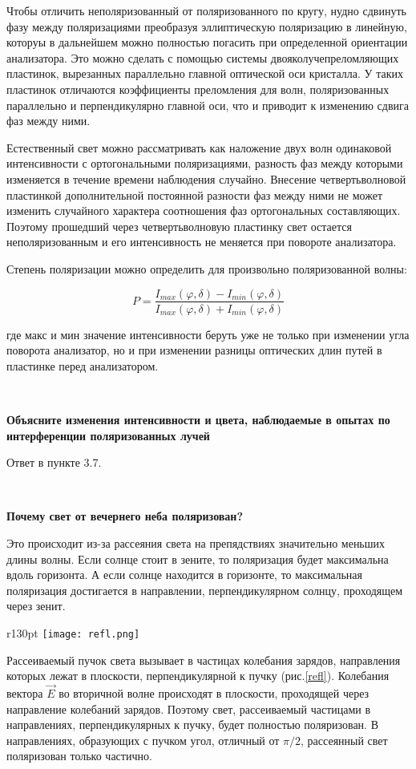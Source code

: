 \documentclass[12pt,a4paper]{article}
\begin{document}
Чтобы отличить неполяризованный от поляризованного по кругу, нудно сдвинуть фазу между поляризациями преобразуя эллиптическую поляризацию в линейную, которуы в дальнейшем можно полностью погасить при определенной ориентации анализатора.  Это можно сделать с помощью системы двояколучепреломляющих пластинок, вырезанных параллельно главной оптической оси кристалла. У таких пластинок отличаются коэффициенты преломления для волн, поляризованных параллельно и перпендикулярно главной оси, что и приводит к изменению сдвига фаз между ними. 

Естественный свет можно рассматривать как наложение двух волн одинаковой интенсивности с ортогональными поляризациями, разность фаз между которыми изменяется в течение времени наблюдения случайно. Внесение четвертьволновой пластинкой дополнительной постоянной разности фаз между ними не может изменить случайного характера соотношения фаз ортогональных составляющих. Поэтому прошедший через четвертьволновую пластинку свет остается неполяризованным и его интенсивность не меняется при повороте анализатора. 

Степень поляризации можно определить для произвольно поляризованной волны:

$$P = \frac{I_{max}(\varphi , \delta) - I_{min}(\varphi , \delta)}{I_{max}(\varphi , \delta) + I_{min}(\varphi , \delta)}$$ 

где макс и мин значение интенсивности беруть уже не только при изменении угла поворота анализатор, но и при изменении разницы оптических длин путей в пластинке перед анализатором. 

\

\textbf{Объясните изменения интенсивности и цвета, наблюдаемые в опытах по интерференции поляризованных лучей}

Ответ в пункте 3.7. 


\

\textbf{Почему свет от вечернего неба поляризован?}

Это происходит из-за рассеяния света на препядствиях значительно меньших длины волны. Если солнце стоит в зените, то поляризация будет максимальна вдоль горизонта. А если солнце находится в горизонте, то максимальная поляризация достигается в направлении, перпендикулярном солнцу, проходящем через зенит. 

\begin{wrapfigure}[10]{r}{130pt}
\texttt{[image: refl.png]}
\caption{Поляризация}
\label{refl}
\end{wrapfigure}

Рассеиваемый пучок света вызывает в частицах колебания зарядов, направления которых лежат в плоскости, перпендикулярной к пучку (рис.\ref{refl}). Колебания вектора $\vec{E}$ во вторичной волне происходят в плоскости, проходящей через направление колебаний зарядов. Поэтому свет, рассеиваемый частицами в направлениях, перпендикулярных к пучку, будет полностью поляризован. В направлениях, образующих с пучком угол, отличный от $\pi/2$, рассеянный свет поляризован только частично. 
\end{document}
